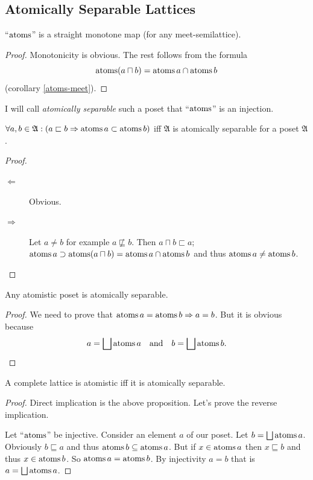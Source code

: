 \subsection{\label{atm-sep}Atomically Separable Lattices}
\begin{prop}
``$\operatorname{atoms}$'' is a straight monotone map (for any meet-semilattice).\end{prop}
\begin{proof}
Monotonicity is obvious. The rest follows from the formula
\[
\operatorname{atoms}(a\sqcap b)=\operatorname{atoms} a\cap\operatorname{atoms} b
\]
(corollary \ref{atoms-meet}).\end{proof}
\begin{defn}
I will call \emph{atomically separable}
such a poset that ``$\operatorname{atoms}$'' is an injection.\end{defn}
\begin{prop}
$\forall a,b\in\mathfrak{A}:(a\sqsubset b\Rightarrow\operatorname{atoms} a\subset\operatorname{atoms} b)$
iff $\mathfrak{A}$ is atomically separable for a poset $\mathfrak{A}$.\end{prop}
\begin{proof}
~
\begin{description}
\item [{$\Leftarrow$}] Obvious.
\item [{$\Rightarrow$}] Let $a\neq b$ for example $a\nsqsubseteq b$.
Then $a\sqcap b\sqsubset a$; $\operatorname{atoms} a\supset\operatorname{atoms}(a\sqcap b)=\operatorname{atoms} a\cap\operatorname{atoms} b$
and thus $\operatorname{atoms} a\neq\operatorname{atoms} b$.
\end{description}
\end{proof}
\begin{prop}
\label{atms-is-asep}Any atomistic poset is atomically separable.\end{prop}
\begin{proof}
We need to prove that $\operatorname{atoms} a=\operatorname{atoms} b\Rightarrow a=b$. But it
is obvious because
\[
a=\bigsqcup\atoms a\quad\text{and}\quad b=\bigsqcup\atoms b.
\]
\end{proof}
\begin{thm}
\label{amstc-sep}A complete lattice is atomistic iff it is atomically
separable.\end{thm}
\begin{proof}
Direct implication is the above proposition. Let's prove the reverse
implication.

Let ``$\operatorname{atoms}$'' be injective. Consider an element $a$ of our
poset. Let $b=\bigsqcup\atoms a$. Obviously $b\sqsubseteq a$ and
thus $\operatorname{atoms} b\subseteq\operatorname{atoms} a$. But if $x\in\operatorname{atoms} a$ then $x\sqsubseteq b$
and thus $x\in\operatorname{atoms} b$. So $\operatorname{atoms} a=\operatorname{atoms} b$. By injectivity
$a=b$ that is $a=\bigsqcup\atoms a$.\end{proof}
